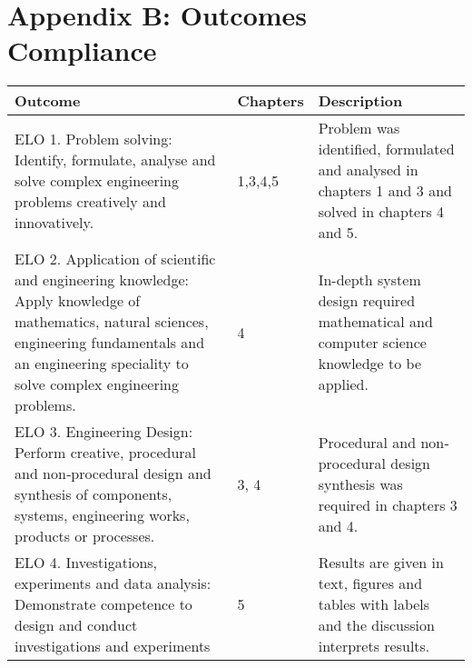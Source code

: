 \setcounter{table}{0}
\renewcommand{\thetable}{B.\arabic{table}}

\vspace{-5cm}



\chapter{Appendix B: Outcomes Compliance}


    
 \begin{table}[H]
  \begin{center}
    \begin{tabular}{ | p{8cm} | l | p{6cm} |}
    \hline
    
    Outcome & Chapters & Description \\ \hline \hline
    
    ELO 1. Problem solving: Identify, formulate, analyse and solve complex 	engineering problems creatively and innovatively. & 1,3,4,5 & Problem was identified, formulated and analysed in chapters 1 and 3 and solved in chapters 4 and 5. \\ \hline
    
    
    ELO 2. Application of scientific and engineering knowledge: Apply knowledge of mathematics, natural sciences,
engineering fundamentals and an engineering speciality to solve complex engineering problems. & 4 & In-depth system design required mathematical and computer science knowledge to be applied. \\ \hline
    
    
    ELO 3. Engineering Design: Perform creative, procedural and non‐procedural design and synthesis of components, systems, engineering works, products or processes. & 3, 4 & Procedural and non‐procedural design synthesis was required in chapters 3 and 4. \\ \hline



    ELO 4. Investigations, experiments and data analysis: Demonstrate competence to design and conduct investigations and experiments & 5 & Results are given in text, figures and tables with labels and the discussion interprets results.  \\  \hline



\end{tabular}
\end{center}
\end{table}
